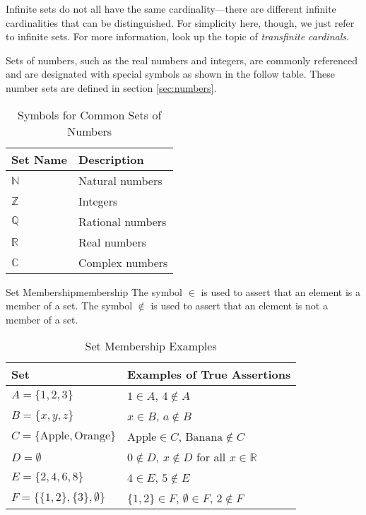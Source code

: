 \begin{advancedTopic}
  Infinite sets do not all have the same cardinality—there are different infinite cardinalities
  that can be distinguished. For simplicity here, though, we just refer to infinite sets. For more
  information, look up the topic of \emph{transfinite cardinals}.
\end{advancedTopic}

Sets of numbers, such as the real numbers and integers, are commonly referenced and are
designated with special symbols as shown in the follow table. These number sets are defined in section
\ref{sec:numbers}.
\begin{table}[H]
  \centering
  \begin{tabular}{p{1in} p{2in}}
  \toprule
  \textbf{Set Name} & \textbf{Description} \\
  \midrule
  \(\mathbb{N}\) & Natural numbers \\
  \(\mathbb{Z}\) & Integers \\
  \(\mathbb{Q}\) & Rational numbers \\
  \(\mathbb{R}\) & Real numbers \\
  \(\mathbb{C}\) & Complex numbers \\
  \bottomrule
  \end{tabular}
  \caption{Symbols for Common Sets of Numbers}
\end{table}

\begin{definition}{Set Membership}{membership}
  The symbol \( \in \) is used to assert that an element is a member of a set.
  The symbol \( \notin \) is used to assert that an element is not a member of a set.
\end{definition}

\begin{table}[H]
  \centering
  \begin{tabular}{p{1.5in} p{2in}}
    \toprule
    \textbf{Set} & \textbf{Examples of True Assertions} \\
    \midrule
    \( A = \{ 1, 2, 3 \} \) & \( 1 \in A \), \( 4 \notin A \) \\
    \( B = \{ x, y, z \} \) & \( x \in B \), \( a \notin B \) \\
    \( C = \{ \text{Apple}, \text{Orange} \} \) & \( \text{Apple} \in C \), \( \text{Banana} \notin C \) \\
    \( D = \emptyset \) & \( 0 \notin D \), \( x \notin D \) for all \(x \in \mathbb{R} \) \\
    \( E = \{ 2, 4, 6, 8 \} \) & \( 4 \in E \), \( 5 \notin E \) \\
    \( F = \{ \{1, 2\}, \{3\}, \emptyset \} \) & \( \{1, 2\} \in F \), \( \emptyset \in F \), \( 2 \notin F \) \\
    \bottomrule
  \end{tabular}
  \caption{Set Membership Examples}
\end{table}

